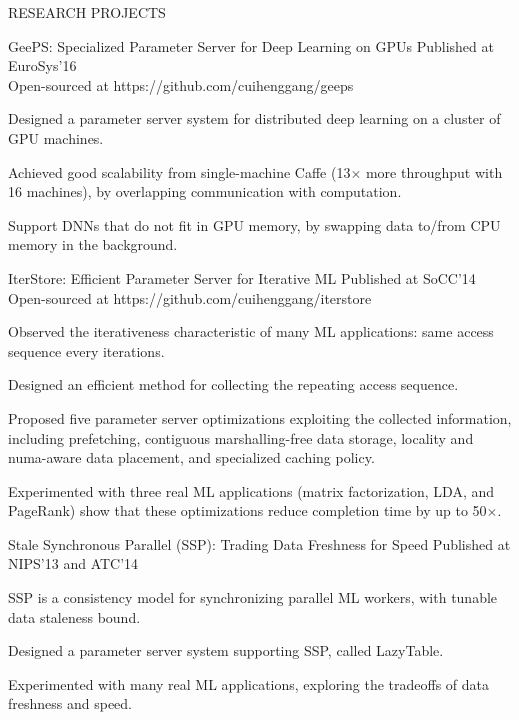 \documentclass{resume} %
\begin{document}
\begin{rSection}{RESEARCH PROJECTS}

\begin{rSubsection}{GeePS: Specialized Parameter Server for Deep Learning on GPUs}{}
{Published at EuroSys'16\\
Open-sourced at https://github.com/cuihenggang/geeps}{}
\item Designed a parameter server system for distributed deep learning on a cluster of GPU machines.
\item Achieved good scalability from single-machine Caffe (13$\times$ more throughput with 16 machines), by overlapping communication with computation.
\item Support DNNs that do not fit in GPU memory, by swapping data to/from CPU memory in the background.
\end{rSubsection}

\begin{rSubsection}{IterStore: Efficient Parameter Server for Iterative ML}{}
{Published at SoCC'14\\
Open-sourced at https://github.com/cuihenggang/iterstore}{}
\item Observed the iterativeness characteristic of many ML applications: same access sequence every iterations.
\item Designed an efficient method for collecting the repeating access sequence.
\item Proposed five parameter server optimizations exploiting the collected information, including prefetching, contiguous marshalling-free data storage, locality and numa-aware data placement, and specialized caching policy.
\item Experimented with three real ML applications (matrix factorization, LDA, and PageRank) show that these optimizations reduce completion time by up to 50$\times$.
\end{rSubsection}

\begin{rSubsection}{Stale Synchronous Parallel (SSP): Trading Data Freshness for Speed}{}
{Published at NIPS'13 and ATC'14}{}
\item SSP is a consistency model for synchronizing parallel ML workers, with tunable data staleness bound.
\item Designed a parameter server system supporting SSP, called LazyTable.
\item Experimented with many real ML applications, exploring the tradeoffs of data freshness and speed.
\end{rSubsection}


\end{rSection}
\end{document}
